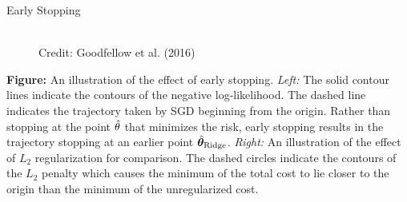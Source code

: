 \documentclass[11pt,compress,t,notes=noshow, xcolor=table]{beamer}
\begin{document}
\begin{vbframe}{Early Stopping}
\begin{figure}
      \tiny{\\ Credit: Goodfellow et al. (2016)\\}
  \end{figure}
  
\footnotesize 
\textbf{Figure:} An illustration of the effect of early stopping. \textit{Left:} The solid contour lines indicate the contours of the negative log-likelihood. The dashed line indicates the trajectory taken by SGD beginning from the origin. Rather than stopping at the point $\hat{\theta}$ that minimizes the risk, early stopping results in the trajectory stopping at an earlier point $\hat{\bm{\theta}}_{\text{Ridge}}$. \textit{Right:} An illustration of the effect of $L_2$ regularization for comparison. The dashed circles indicate the contours of the $L_2$ penalty which causes the minimum of the total cost to lie closer to the origin than the minimum of the unregularized cost.
\end{vbframe}



\endlecture
\end{document}
